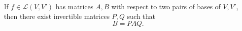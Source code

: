 If $f \in \mathcal{L}(V, V')$ has matrices $A, B$ with respect to two pairs of bases of $V, V'$, then there exist invertible matrices $P, Q$ such that
$$
B = P A Q.
$$
